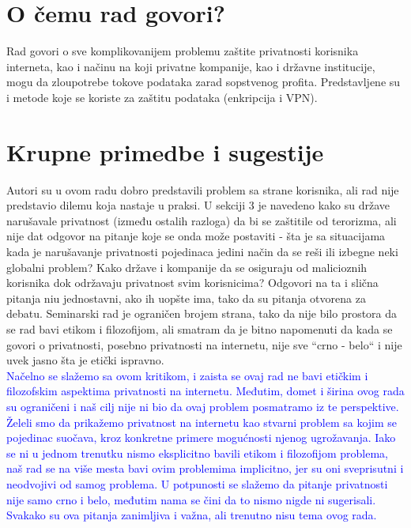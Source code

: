 \documentclass[a4paper]{report}
\newcommand{\odgovor}[1]{\textcolor{blue}{#1}}
\begin{document}
\section{O čemu rad govori?}
Rad govori o sve komplikovanijem problemu zaštite privatnosti korisnika interneta, kao i načinu na koji privatne kompanije, kao i državne institucije, mogu da zloupotrebe tokove podataka zarad sopstvenog profita. Predstavljene su i metode koje se koriste za zaštitu podataka (enkripcija i VPN).


\section{Krupne primedbe i sugestije}
Autori su u ovom radu dobro predstavili problem sa strane korisnika, ali rad nije predstavio dilemu koja nastaje u praksi. U sekciji 3 je navedeno kako su države narušavale privatnost (između ostalih razloga) da bi se zaštitile od terorizma, ali nije dat odgovor na pitanje koje se onda može postaviti - šta je sa situacijama kada je narušavanje privatnosti pojedinaca jedini način da se reši ili izbegne neki globalni problem? Kako države i kompanije da se osiguraju od malicioznih korisnika dok održavaju privatnost svim korisnicima? Odgovori na ta i slična pitanja niu jednostavni, ako ih uopšte ima, tako da su pitanja otvorena za debatu. Seminarski rad je ograničen brojem strana, tako da nije bilo prostora da se rad bavi etikom i filozofijom, ali smatram da je bitno napomenuti da kada se govori o privatnosti, posebno privatnosti na internetu, nije sve ``crno - belo`` i nije uvek jasno šta je etički ispravno.
\\
\odgovor{Načelno se slažemo sa ovom kritikom, i zaista se ovaj rad ne bavi etičkim i filozofskim aspektima privatnosti na internetu. Međutim, domet i širina ovog rada su ograničeni i naš cilj nije ni bio da ovaj problem posmatramo iz te perspektive. Želeli smo da prikažemo privatnost na internetu kao stvarni problem sa kojim se pojedinac suočava, kroz konkretne primere mogućnosti njenog ugrožavanja. Iako se ni u jednom trenutku nismo eksplicitno bavili etikom i filozofijom problema, naš rad se na više mesta bavi ovim problemima implicitno, jer su oni sveprisutni i neodvojivi od samog problema. U potpunosti se slažemo da pitanje privatnosti nije samo crno i belo, međutim nama se čini da to nismo nigde ni sugerisali. Svakako su ova pitanja zanimljiva i važna, ali trenutno nisu tema ovog rada.} 
\end{document}
